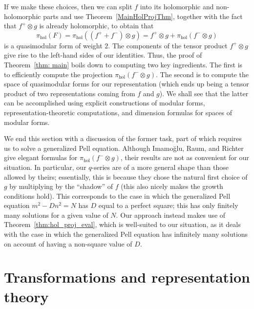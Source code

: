 \documentclass[11pt,reqno]{amsart}
\renewcommand{\=}{\;=\;}
\theoremstyle{myremark}
\begin{document}
If we make these choices, then we can split $f$ into its holomorphic and non-holomorphic parts and use Theorem~\ref{MainHolProjThm}, together with the fact that $f^+\otimes g$ is already holomorphic, to obtain that
\begin{equation}\label{eqn:split hol_proj}
\pi_{\mathrm{hol}}(F)=\pi_{\mathrm{hol}}\left( (f^+ + f^-)\otimes g
\right)=
f^+\otimes g+\pi_{\mathrm{hol}}\left(f^-\otimes g\right)   
\end{equation}
is a quasimodular form of weight $2$. 
The components of the tensor product $f^+\otimes g$ give rise to the left-hand sides of our identities. 
Thus, the proof of Theorem~\ref{thm: main} boils down to computing two key ingredients. 
The first is to efficiently compute the projection $\pi_{\mathrm{hol}}\left(f^-\otimes g\right)$. 
The second is to compute the space of quasimodular forms for our representation (which ends up being a tensor product of two representations coming from $f$ and $g$). 
We shall see that the latter can be accomplished using explicit constructions of modular forms, representation-theoretic computations, and dimension formulas for spaces of modular forms.

We end this section with a discussion of the former task, part of which requires us to solve a generalized Pell equation. 
Although Imamo\u{g}lu, Raum, and Richter give elegant formulas for $\pi_{\mathrm{hol}}\left(f^-\otimes g\right)$, their results are not as convenient for our situation. 
In particular, our $q$-series are of a more general shape than those allowed by theirs; essentially, this is because they chose the natural first choice of $g$ by multiplying by the ``shadow'' of $f$ (this also nicely makes the growth conditions hold). 
This corresponds to the case in which the generalized Pell equation $m^2 - Dn^2 = N$ has $D$ equal to a perfect square; this has only finitely many solutions for a given value of $N$. 
Our approach instead makes use of Theorem~\ref{thm:hol_proj_eval}, which is well-suited to our situation, as it deals with the case in which the generalized Pell equation has infinitely many solutions on account of having a non-square value of $D$.
\section{Transformations and representation theory}
\label{sec:transrep}
\end{document}
